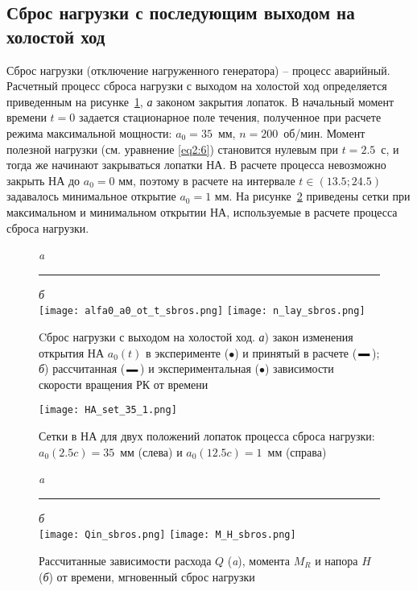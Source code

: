 \subsection{Сброс нагрузки с последующим выходом на холостой ход}
Сброс нагрузки (отключение нагруженного генератора) -- процесс аварийный. Расчетный процесс сброса нагрузки с 
выходом на холостой ход определяется приведенным на рисунке~\ref{fig2:9}, \emph{а} законом закрытия лопаток.
В начальный момент времени $t=0$ задается стационарное поле течения, полученное при расчете режима 
максимальной мощности: $a_0=35$~мм, $n=200$~об/мин. Момент полезной нагрузки (см. уравнение \eqref{eq2:6}) 
становится нулевым при $t=2.5$~с, и тогда же начинают закрываться лопатки НА. В расчете процесса невозможно
закрыть НА до $a_0=0$ мм, поэтому в расчете на интервале $t\in(13.5;24.5)$ задавалось минимальное открытие 
$a_0=1$ мм. На рисунке~\ref{fig2:10} приведены сетки при максимальном и минимальном открытии НА, используемые 
в расчете процесса сброса нагрузки.

\begin{figure}[htb]
  \centering \small \rule{0mm}{0mm}\emph{a}\rule{95mm}{0mm}\emph{б}\\[1.5mm]
  {\texttt{[image: alfa0\_a0\_ot\_t\_sbros.png]}}\hfill
  {\texttt{[image: n\_lay\_sbros.png]}}
  \caption{Cброс нагрузки с выходом на холостой ход.
   \emph{а}) закон изменения открытия НА $a_0(t)$ в эксперименте ($\bullet$) и принятый в 
   расчете (\textcolor{blue}{$\genfrac{}{}{2pt}{2}{\quad}{  }$});
   \emph{б}) рассчитанная (\textcolor{blue}{$\genfrac{}{}{2pt}{2}{\quad}{  }$}) и 
   экспериментальная ($\bullet$) зависимости скорости вращения РК от времени}
  \label{fig2:9}
\end{figure}

\begin{figure}[t!]
  \centering
  \texttt{[image: HA\_set\_35\_1.png]}
  \caption {Сетки в НА для двух положений лопаток процесса сброса нагрузки:
   $a_0(2.5 c)=35$~мм (слева) и $a_0(12.5 c)=1$~мм (справа)}
  \label{fig2:10}
\end{figure}
\begin{figure}[hb!]
  \centering \small \rule{0mm}{0mm}\emph{a}\rule{90mm}{0mm}\emph{б}\\[1.5mm]
  {\texttt{[image: Qin\_sbros.png]}}\hfill
  {\texttt{[image: M\_H\_sbros.png]}}
  \caption{Рассчитанные зависимости расхода $Q$ (\emph{a}), момента $M_R$ и
   напора $H$ (\emph{б}) от времени, мгновенный сброс нагрузки}
  \label{fig2:11}
\end{figure}

